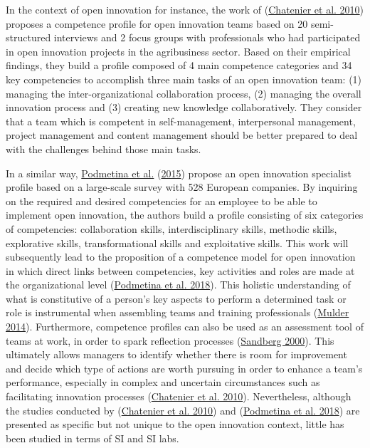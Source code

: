 \documentclass[AMA,STIX1COL,APA,STIX2COL]{WileyNJD-v2}
\begin{document}
In the context of open innovation for instance, the work of
(\protect\hyperlink{ref-Chatenier2010}{Chatenier et al. 2010}) proposes
a competence profile for open innovation teams based on 20
semi-structured interviews and 2 focus groups with professionals who had
participated in open innovation projects in the agribusiness sector.
Based on their empirical findings, they build a profile composed of 4
main competence categories and 34 key competencies to accomplish three
main tasks of an open innovation team: (1) managing the
inter-organizational collaboration process, (2) managing the overall
innovation process and (3) creating new knowledge collaboratively. They
consider that a team which is competent in self-management,
interpersonal management, project management and content management
should be better prepared to deal with the challenges behind those main
tasks.

In a similar way, \protect\hyperlink{ref-Podmetina2015}{Podmetina et
al.} (\protect\hyperlink{ref-Podmetina2015}{2015}) propose an open
innovation specialist profile based on a large-scale survey with 528
European companies. By inquiring on the required and desired
competencies for an employee to be able to implement open innovation,
the authors build a profile consisting of six categories of
competencies: collaboration skills, interdisciplinary skills, methodic
skills, explorative skills, transformational skills and exploitative
skills. This work will subsequently lead to the proposition of a
competence model for open innovation in which direct links between
competencies, key activities and roles are made at the organizational
level (\protect\hyperlink{ref-Podmetina2018}{Podmetina et al. 2018}).
This holistic understanding of what is constitutive of a person's key
aspects to perform a determined task or role is instrumental when
assembling teams and training professionals
(\protect\hyperlink{ref-Mulder2014}{Mulder 2014}). Furthermore,
competence profiles can also be used as an assessment tool of teams at
work, in order to spark reflection processes
(\protect\hyperlink{ref-Sandberg2000}{Sandberg 2000}). This ultimately
allows managers to identify whether there is room for improvement and
decide which type of actions are worth pursuing in order to enhance a
team's performance, especially in complex and uncertain circumstances
such as facilitating innovation processes
(\protect\hyperlink{ref-Chatenier2010}{Chatenier et al. 2010}).
Nevertheless, although the studies conducted by
(\protect\hyperlink{ref-Chatenier2010}{Chatenier et al. 2010}) and
(\protect\hyperlink{ref-Podmetina2018}{Podmetina et al. 2018}) are
presented as specific but not unique to the open innovation context,
little has been studied in terms of SI and SI labs.
\end{document}
